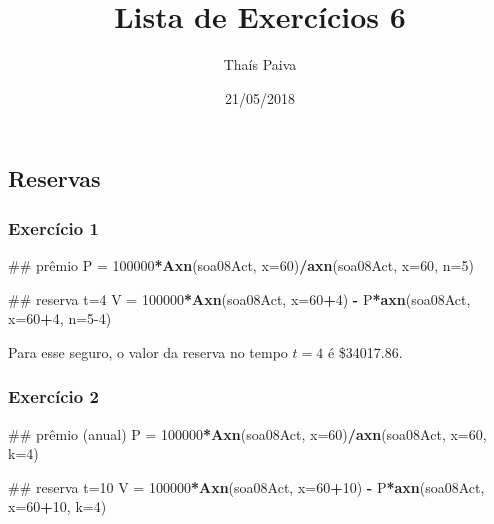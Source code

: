 \documentclass[]{article}
\title{Lista de Exercícios 6}
\author{Thaís Paiva}
\date{21/05/2018}
\newenvironment{Shaded}{\begin{snugshade}}{\end{snugshade}}
\newcommand{\DataTypeTok}[1]{\textcolor[rgb]{0.13,0.29,0.53}{#1}}
\newcommand{\DecValTok}[1]{\textcolor[rgb]{0.00,0.00,0.81}{#1}}
\newcommand{\KeywordTok}[1]{\textcolor[rgb]{0.13,0.29,0.53}{\textbf{#1}}}
\newcommand{\NormalTok}[1]{#1}
\newcommand{\OperatorTok}[1]{\textcolor[rgb]{0.81,0.36,0.00}{\textbf{#1}}}
\newcommand{\StringTok}[1]{\textcolor[rgb]{0.31,0.60,0.02}{#1}}
\begin{document}
\maketitle

\hypertarget{reservas}{%
\subsection{Reservas}\label{reservas}}

\hypertarget{exercicio-1}{%
\subsubsection{Exercício 1}\label{exercicio-1}}

\begin{Shaded}
\begin{Highlighting}[]
\NormalTok{## prêmio}
\NormalTok{P =}\StringTok{ }\DecValTok{100000}\OperatorTok{*}\KeywordTok{Axn}\NormalTok{(soa08Act, }\DataTypeTok{x=}\DecValTok{60}\NormalTok{)}\OperatorTok{/}\KeywordTok{axn}\NormalTok{(soa08Act, }\DataTypeTok{x=}\DecValTok{60}\NormalTok{, }\DataTypeTok{n=}\DecValTok{5}\NormalTok{)}

\NormalTok{## reserva t=4}
\NormalTok{V =}\StringTok{ }\DecValTok{100000}\OperatorTok{*}\KeywordTok{Axn}\NormalTok{(soa08Act, }\DataTypeTok{x=}\DecValTok{60}\OperatorTok{+}\DecValTok{4}\NormalTok{) }\OperatorTok{-}\StringTok{ }\NormalTok{P}\OperatorTok{*}\KeywordTok{axn}\NormalTok{(soa08Act, }\DataTypeTok{x=}\DecValTok{60}\OperatorTok{+}\DecValTok{4}\NormalTok{, }\DataTypeTok{n=}\DecValTok{5-4}\NormalTok{)}
\end{Highlighting}
\end{Shaded}

Para esse seguro, o valor da reserva no tempo \(t=4\) é \$34017.86.

\hypertarget{exercicio-2}{%
\subsubsection{Exercício 2}\label{exercicio-2}}

\begin{Shaded}
\begin{Highlighting}[]
\NormalTok{## prêmio (anual)}
\NormalTok{P =}\StringTok{ }\DecValTok{100000}\OperatorTok{*}\KeywordTok{Axn}\NormalTok{(soa08Act, }\DataTypeTok{x=}\DecValTok{60}\NormalTok{)}\OperatorTok{/}\KeywordTok{axn}\NormalTok{(soa08Act, }\DataTypeTok{x=}\DecValTok{60}\NormalTok{, }\DataTypeTok{k=}\DecValTok{4}\NormalTok{)}

\NormalTok{## reserva t=10}
\NormalTok{V =}\StringTok{ }\DecValTok{100000}\OperatorTok{*}\KeywordTok{Axn}\NormalTok{(soa08Act, }\DataTypeTok{x=}\DecValTok{60}\OperatorTok{+}\DecValTok{10}\NormalTok{) }\OperatorTok{-}\StringTok{ }\NormalTok{P}\OperatorTok{*}\KeywordTok{axn}\NormalTok{(soa08Act, }\DataTypeTok{x=}\DecValTok{60}\OperatorTok{+}\DecValTok{10}\NormalTok{, }\DataTypeTok{k=}\DecValTok{4}\NormalTok{)}
\end{Highlighting}
\end{Shaded}
\end{document}
